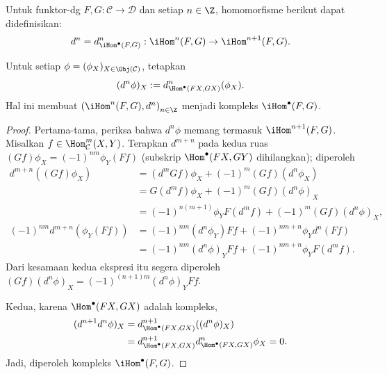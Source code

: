 \begin{definition-proposition}
	Untuk funktor-dg $F,G:\mathcal{C}\to\mathcal{D}$ dan setiap $n\in\Z$,
	homomorfisme berikut dapat didefinisikan:
	\[ d^n = d^n_{\iHom^\bullet(F, G)}: \iHom^n(F, G) \to \iHom^{n+1}(F, G). \]

	Untuk setiap $\phi=(\phi_X)_{X\in\Obj(\mathcal{C})}$, tetapkan
	\[ (d^n \phi)_X := d^n_{\Hom^\bullet(FX, GX)}(\phi_X). \]
	Hal ini membuat $\left(\iHom^n(F,G),d^n\right)_{n\in\Z}$ menjadi kompleks
	$\iHom^\bullet(F,G)$.
\end{definition-proposition}
\begin{proof}
	Pertama-tama, periksa bahwa $d^n\phi$ memang termasuk
	$\iHom^{n+1}(F,G)$. Misalkan $f\in\Hom^m_{\mathcal{C}}(X,Y)$. Terapkan
	$d^{m+n}$ pada kedua ruas
	$(Gf)\phi_X=(-1)^{nm}\phi_Y(Ff)$ (subskrip
	$\Hom^\bullet(FX,GY)$ dihilangkan); diperoleh
	\begin{align*}
		d^{m+n}((Gf) \phi_X) & = (d^m Gf) \phi_X + (-1)^m (Gf) (d^n \phi_X) \\
		& = G (d^m f) \phi_X + (-1)^m (Gf) (d^n \phi)_X \\
		& = (-1)^{n(m+1)} \phi_Y F(d^m f) + (-1)^m (Gf) (d^n \phi)_X, \\
		(-1)^{nm} d^{m+n}(\phi_Y (Ff)) & = (-1)^{nm} (d^n \phi_Y) Ff + (-1)^{nm+n} \phi_Y d^n(Ff) \\
		& = (-1)^{nm} (d^n \phi)_Y Ff + (-1)^{nm+n} \phi_Y F(d^m f).
	\end{align*}
	Dari kesamaan kedua ekspresi itu segera diperoleh
	$(Gf)(d^n\phi)_X=(-1)^{(n+1)m}(d^n\phi)_YFf$.

	Kedua, karena $\Hom^\bullet(FX,GX)$ adalah kompleks,
	\begin{align*}
		(d^{n+1} d^n \phi)_X & = d^{n+1}_{\Hom^\bullet(FX, GX)}((d^n \phi)_X) \\
		& = d^{n+1}_{\Hom^\bullet(FX, GX)} d^n_{\Hom^\bullet(FX, GX)} \phi_X = 0.
	\end{align*}
	Jadi, diperoleh kompleks $\iHom^\bullet(F,G)$.
\end{proof}

